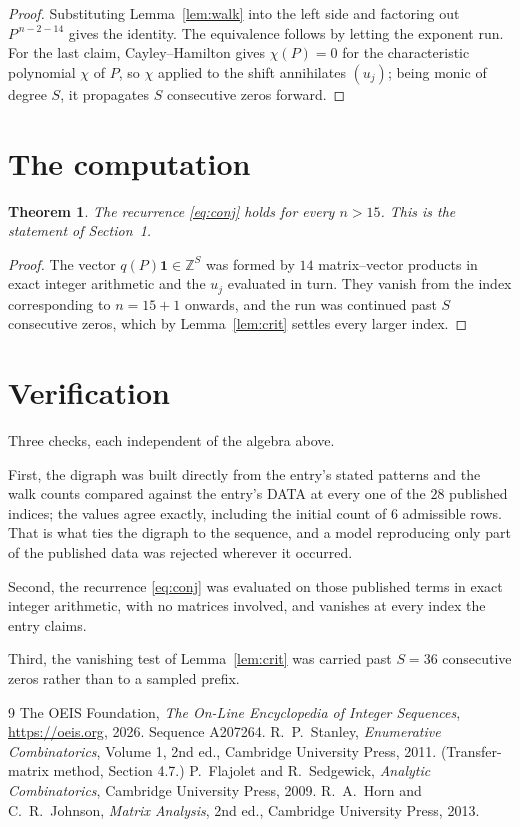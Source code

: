 \documentclass[11pt,a4paper]{article}
\theoremstyle{plain}
\newtheorem{theorem}{Theorem}
\theoremstyle{definition}
\begin{document}
\begin{proof}
Substituting Lemma~\ref{lem:walk} into the left side and factoring out
$P^{\,n-2-14}$ gives the identity. The equivalence follows by letting the exponent
run. For the last claim, Cayley--Hamilton gives $\chi(P)=0$ for the characteristic
polynomial $\chi$ of $P$, so $\chi$ applied to the shift annihilates $(u_j)$; being monic of
degree $S$, it propagates $S$ consecutive zeros forward.
\end{proof}

\section{The computation}

\begin{theorem}
The recurrence \eqref{eq:conj} holds for every $n>15$. This is the statement of
Section~1.
\end{theorem}

\begin{proof}
The vector $q(P)\mathbf{1}\in\mathbb{Z}^{S}$ was formed by $14$ matrix--vector
products in exact integer arithmetic and the $u_j$ evaluated in turn. They vanish from the
index corresponding to $n=15+1$ onwards, and the run was continued past $S$ consecutive
zeros, which by Lemma~\ref{lem:crit} settles every larger index.
\end{proof}

\section{Verification}

Three checks, each independent of the algebra above.

First, the digraph was built directly from the entry's stated patterns and the walk counts
compared against the entry's DATA at every one of the $28$ published indices; the
values agree exactly, including the initial count of $6$ admissible rows. That is
what ties the digraph to the sequence, and a model reproducing only part of the published
data was rejected wherever it occurred.

Second, the recurrence \eqref{eq:conj} was evaluated on those published terms in exact
integer arithmetic, with no matrices involved, and vanishes at every index the entry claims.

Third, the vanishing test of Lemma~\ref{lem:crit} was carried past $S=36$ consecutive
zeros rather than to a sampled prefix.

\begin{thebibliography}{9}
 The OEIS Foundation, \emph{The On-Line Encyclopedia of Integer
Sequences}, \url{https://oeis.org}, 2026. Sequence A207264.
 R.~P.~Stanley, \emph{Enumerative Combinatorics}, Volume 1, 2nd ed.,
Cambridge University Press, 2011. (Transfer-matrix method, Section 4.7.)
 P.~Flajolet and R.~Sedgewick, \emph{Analytic Combinatorics}, Cambridge
University Press, 2009.
 R.~A.~Horn and C.~R.~Johnson, \emph{Matrix Analysis}, 2nd ed., Cambridge
University Press, 2013.
\end{thebibliography}
\end{document}
